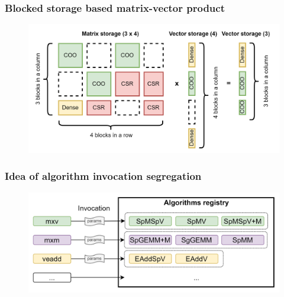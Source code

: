 \documentclass[aspectratio=169,xcolor=table,english]{beamer}
\begin{document}
\begin{frame}[fragile] \frametitle{Blocked storage based matrix-vector product}
    \begin{center}
    \begin{minipage}[m]{0.9\linewidth}
        \begin{figure}
            \centering
            \includegraphics[width=1.0\textwidth]{figures/blocked_storage_mxv.png}
        \end{figure}
    \end{minipage}\hfill   
    \end{center}
\end{frame}

\begin{frame}[fragile] \frametitle{Idea of algorithm invocation segregation}
    \begin{center}
    \begin{minipage}[m]{0.9\linewidth}
        \begin{figure}
            \centering
            \includegraphics[width=1.0\textwidth]{figures/algo_registry_idea.png}
        \end{figure}
    \end{minipage}\hfill   
    \end{center}
\end{frame}
\end{document}
